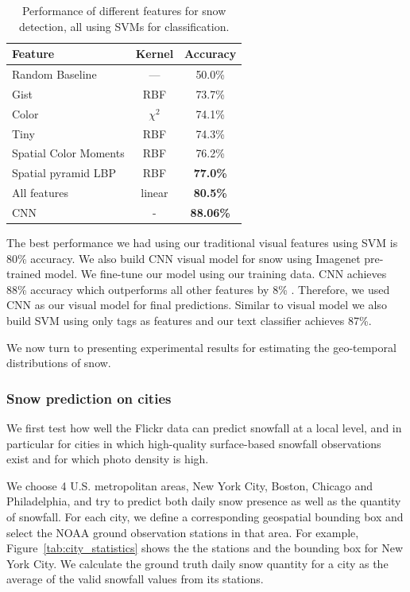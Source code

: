 \documentclass[10pt,journal,compsoc]{IEEEtran}
\begin{document}
\begin{table}
\begin{center}
{\footnotesize{
\begin{tabular}{|l|c|c|}
\hline 
Feature & Kernel  & Accuracy\tabularnewline
\hline 
\hline 
Random Baseline  & --- & 50.0\%\tabularnewline
\hline 
\hline
Gist & RBF & 73.7\%\tabularnewline
\hline 
Color  & $\chi^2$ & 74.1\%\tabularnewline
\hline
Tiny & RBF & 74.3\%\tabularnewline
\hline 
Spatial Color Moments & RBF & 76.2\%\tabularnewline
\hline 
Spatial pyramid LBP & RBF &\textbf{77.0\%}\tabularnewline
\hline 
\hline
All features  & linear & \textbf{80.5\%}\tabularnewline
\hline 
CNN& -& \textbf{88.06\%}\tabularnewline
\hline
\end{tabular}
}}
\caption{Performance of different features  for snow detection, all using SVMs for classification. }
\label{tab:snow}
\end{center}
\end{table}



The best performance we had using our traditional visual features using SVM is 80\% accuracy.  We also build CNN visual model for snow using Imagenet pre-trained model. We fine-tune our model using our training data. CNN  achieves 88\% accuracy which  outperforms all other features by 8\% . Therefore, we used CNN as our visual model for final predictions.  Similar to visual model we also build SVM using only tags as features and our text classifier achieves 87\%.




We now turn to presenting experimental results for estimating the
geo-temporal distributions of snow.

\subsubsection{Snow prediction on cities}


We first test how well the Flickr data can predict snowfall at a local
level, and in particular for cities in which high-quality
surface-based snowfall observations exist and for which photo density is high.

We choose 4 U.S. metropolitan areas, New York City, Boston, Chicago and
Philadelphia, and try to predict both daily snow presence as well as
the quantity of snowfall.  For each city, we define a corresponding
geospatial bounding box and select the NOAA ground observation stations in that area. 
For example, 
Figure~\ref{tab:city_statistics} shows the the stations 
and the bounding box for 
New York City. We calculate the ground truth daily snow quantity for a city as the average of
the valid 
snowfall values from its stations.
\end{document}
